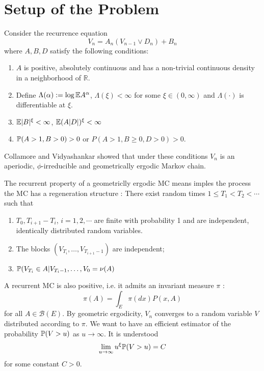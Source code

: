 \documentclass{beamer}
\begin{document}
\section{Setup of the Problem}
\begin{frame}
  Consider the recurrence equation 
  \[
  V_n = A_n (V_{n-1} \vee D_n) + B_n
  \]
  where $A, B, D$ satisfy the following conditions:
  \begin{enumerate}
  \item $A$ is positive, absolutely continuous and has a non-trivial continuous density in
    a neighborhood of $\mathbb R$.
  \item Define $\Lambda(\alpha) := \log \E A^\alpha$, $\Lambda(\xi) < \infty$ for some $\xi \in (0,
    \infty)$ and $\Lambda(\cdot)$ is differentiable at $\xi$.
  \item $\E |B|^\xi < \infty$, $\E (A|D|)^\xi < \infty$
  \item $\P(A > 1, B > 0) > 0$ or $P(A > 1, B \geq 0, D > 0) > 0$.
  \end{enumerate}
  Collamore and Vidyashankar \cite{Collamore20133378} showed that
  under these conditions $V_n$ is an aperiodic, $\phi$-irreducible and
  geometrically ergodic Markov chain.
\end{frame}

\begin{frame}
  The recurrent property of a geometriclly ergodic MC means imples the
  process the MC has a regeneration structure \cite{Nummelin1978}:
  There exist random times $1 \leq T_1 < T_2 < \cdots$ such that
  \begin{enumerate}
  \item $T_0, T_{i+1} - T_{i}$, $i = 1, 2, \cdots$ are finite with
    probability 1 and are independent, identically distributed random
    variables.
  \item The blocks $(V_{T_i}, \dots, V_{T_{i+1} - 1})$ are independent;
  \item $\P(V_{T_i} \in A | V_{T_{i}-1}, \dots, V_0 = \nu(A)$
  \end{enumerate}
\end{frame}

\begin{frame}
  A recurrent MC is also positive, i.e. it admits an invariant
  measure $\pi$ \cite{Meyn:2009:MCS:1550713}:
  \[
  \pi(A) = \int_E \pi(dx) P(x, A)
  \]
  for all $A \in \mathcal B(E)$.
  By geometric ergodicity, $V_n$ converges to a random variable $V$
  distributed according to $\pi$. We want to have an efficient estimator of the
  probability $\P(V > u)$ as $u \to \infty$. It is understood
  \[
   \lim_{u \to \infty} u^\xi \P(V > u) = C
  \]
  for some constant $C > 0$.
\end{frame}
\end{document}
